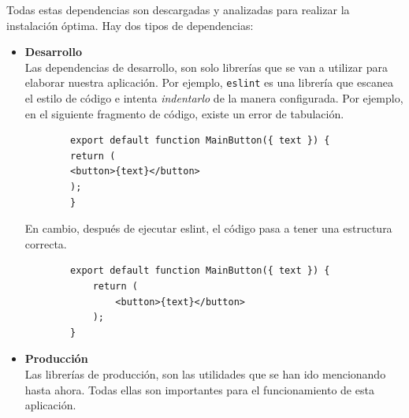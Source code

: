 Todas estas dependencias son descargadas y analizadas para realizar la instalación óptima.
Hay dos tipos de dependencias:
\begin{itemize}
    \item \textbf{Desarrollo}\\
    Las dependencias de desarrollo, son solo librerías que se van a utilizar para elaborar nuestra aplicación. Por ejemplo, \verb|eslint| \cite{web:eslint} es una librería que escanea el estilo de código e intenta \textit{indentarlo} de la manera configurada.
    Por ejemplo, en el siguiente fragmento de código, existe un error de tabulación.
    \begin{lstlisting}
        export default function MainButton({ text }) {
        return (
        <button>{text}</button>
        );
        }
    \end{lstlisting}
    En cambio, después de ejecutar eslint, el código pasa a tener una estructura correcta.
    \begin{lstlisting}
        export default function MainButton({ text }) {
            return (
                <button>{text}</button>
            );
        }
    \end{lstlisting}
    \item \textbf{Producción}\\
    Las librerías de producción, son las utilidades que se han ido mencionando hasta ahora. Todas ellas son importantes para el funcionamiento de esta aplicación.
\end{itemize}
